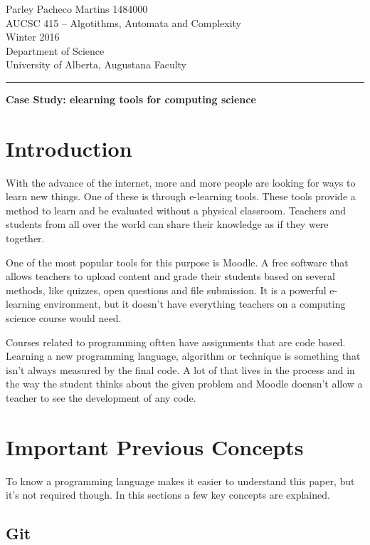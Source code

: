 \documentclass[12pt]{article}
\begin{document}
\noindent
Parley Pacheco Martins 1484000\\
AUCSC 415 -- Algotithms, Automata and Complexity\\
Winter 2016\\
Department of Science\\
University of Alberta, Augustana Faculty

\vspace*{0.75\baselineskip}
\hrule
\vspace*{0.75\baselineskip}

\noindent
{\Large\bf Case Study: elearning tools for computing science}

\section{Introduction}

With the advance of the internet, more and more people are looking for ways to learn new things. One of these is through e-learning tools. These tools provide a method to learn and be evaluated without a physical classroom. Teachers and students from all over the world can share their knowledge as if they were together.

One of the most popular tools for this purpose is Moodle. A free software that allows teachers to upload content and grade their students based on several methods, like quizzes, open questions and file submission. It is a powerful e-learning environment, but it doesn't have everything teachers on a computing science course would need.

Courses related to programming oftten have assignments that are code based. Learning a new programming language, algorithm or technique is something that isn't always measured by the final code. A lot of that lives in the process and in the way the student thinks about the given problem and Moodle doensn't allow a teacher to see the development of any code.


\section{Important Previous Concepts}

To know a programming language makes it easier to understand this paper, but it's not required though. In this sections a few key concepts are explained.

\subsection{Git}
\end{document}
